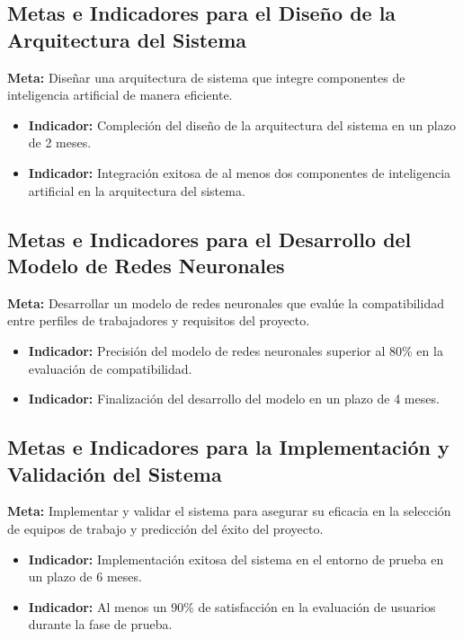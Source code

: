 \documentclass{article}
\begin{document}
    \subsection{Metas e Indicadores para el Diseño de la Arquitectura del Sistema}
    \textbf{Meta:} Diseñar una arquitectura de sistema que integre componentes de inteligencia artificial de manera eficiente.
    \begin{itemize}
        \item \textbf{Indicador:} Compleción del diseño de la arquitectura del sistema en un plazo de 2 meses.
        \item \textbf{Indicador:} Integración exitosa de al menos dos componentes de inteligencia artificial en la arquitectura del sistema.
    \end{itemize}

    \subsection{Metas e Indicadores para el Desarrollo del Modelo de Redes Neuronales}
    \textbf{Meta:} Desarrollar un modelo de redes neuronales que evalúe la compatibilidad entre perfiles de trabajadores y requisitos del proyecto.
    \begin{itemize}
        \item \textbf{Indicador:} Precisión del modelo de redes neuronales superior al 80\% en la evaluación de compatibilidad.
        \item \textbf{Indicador:} Finalización del desarrollo del modelo en un plazo de 4 meses.
    \end{itemize}

    \subsection{Metas e Indicadores para la Implementación y Validación del Sistema}
    \textbf{Meta:} Implementar y validar el sistema para asegurar su eficacia en la selección de equipos de trabajo y predicción del éxito del proyecto.
    \begin{itemize}
        \item \textbf{Indicador:} Implementación exitosa del sistema en el entorno de prueba en un plazo de 6 meses.
        \item \textbf{Indicador:} Al menos un 90\% de satisfacción en la evaluación de usuarios durante la fase de prueba.
    \end{itemize}
\end{document}
